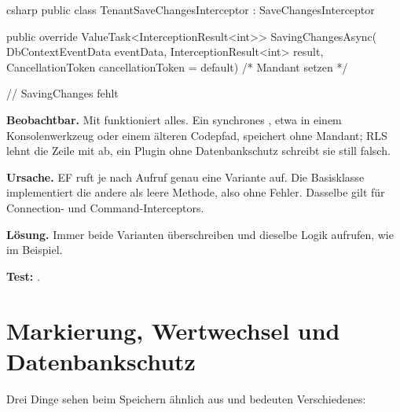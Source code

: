 \begin{sourcecode}{csharp}
public class TenantSaveChangesInterceptor : SaveChangesInterceptor
{
    public override ValueTask<InterceptionResult<int>> SavingChangesAsync(
        DbContextEventData eventData, InterceptionResult<int> result,
        CancellationToken cancellationToken = default) { /* Mandant setzen */ }

    // SavingChanges fehlt
}
\end{sourcecode}

\begin{failure}
  \textbf{Beobachtbar.} Mit  funktioniert
  alles. Ein synchrones , etwa in einem Konsolenwerkzeug oder
  einem älteren Codepfad, speichert ohne Mandant; RLS lehnt die Zeile mit
   ab, ein Plugin ohne Datenbankschutz schreibt sie still falsch.

  \textbf{Ursache.} EF ruft je nach Aufruf genau eine Variante auf. Die Basisklasse
   implementiert die andere als
  leere Methode, also ohne Fehler. Dasselbe gilt für Connection- und Command-Interceptors.

  \textbf{Lösung.} Immer beide Varianten überschreiben und dieselbe Logik aufrufen, wie
   im Beispiel.

  \textbf{Test:}
  .
\end{failure}

\section{Markierung, Wertwechsel und Datenbankschutz}\label{sec:tracking-flag-versus-value}

Drei Dinge sehen beim Speichern ähnlich aus und bedeuten Verschiedenes:

